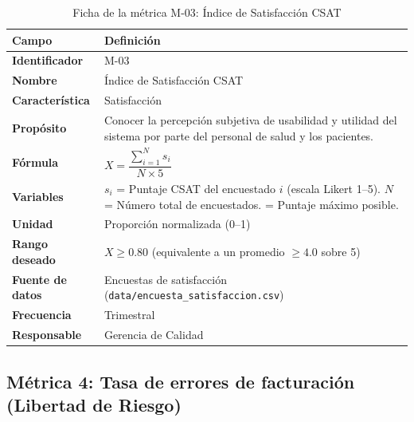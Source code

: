 \documentclass[12pt,a4paper]{article}
\begin{document}
\begin{table}[H]
\centering
\caption{Ficha de la m\'etrica M-03: \'Indice de Satisfacci\'on CSAT}
\begin{tabularx}{\textwidth}{l X}
\toprule
\textbf{Campo} & \textbf{Definici\'on} \\
\midrule
\textbf{Identificador} & M-03 \\
\textbf{Nombre} & \'Indice de Satisfacci\'on CSAT \\
\textbf{Caracter\'istica} & Satisfacci\'on \\
\textbf{Prop\'osito} & Conocer la percepci\'on subjetiva de usabilidad y utilidad del sistema por parte del personal de salud y los pacientes. \\
\textbf{F\'ormula} & $X = \dfrac{\sum_{i=1}^{N} s_i}{N \times 5}$ \\
\textbf{Variables} & $s_i$ = Puntaje CSAT del encuestado $i$ (escala Likert 1--5). \newline $N$ = N\'umero total de encuestados. \newline 5 = Puntaje m\'aximo posible. \\
\textbf{Unidad} & Proporci\'on normalizada (0--1) \\
\textbf{Rango deseado} & $X \ge 0.80$ (equivalente a un promedio $\ge 4.0$ sobre 5) \\
\textbf{Fuente de datos} & Encuestas de satisfacci\'on (\texttt{data/encuesta\_satisfaccion.csv}) \\
\textbf{Frecuencia} & Trimestral \\
\textbf{Responsable} & Gerencia de Calidad \\
\bottomrule
\end{tabularx}
\end{table}

\subsection{M\'etrica 4: Tasa de errores de facturaci\'on (Libertad de Riesgo)}
\end{document}
